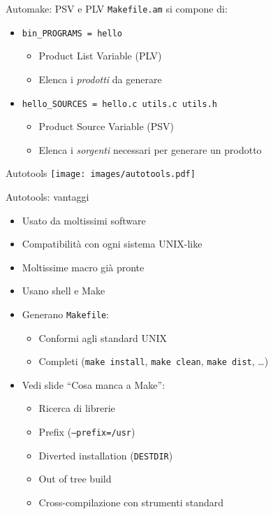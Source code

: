 \documentclass[xetex,table]{beamer}
\begin{document}
\begin{frame}[fragile]{Automake: PSV e PLV}
  \texttt{Makefile.am} si compone di:

  \begin{itemize}
  \item \texttt{bin_PROGRAMS = hello}
    \begin{itemize}
    \item Product List Variable (PLV)
    \item Elenca i {\em prodotti} da generare
    \end{itemize}
  \end{itemize}

  \begin{itemize}
  \item \texttt{hello_SOURCES = hello.c utils.c utils.h}
    \begin{itemize}
    \item Product Source Variable (PSV)
    \item Elenca i {\em sorgenti} necessari per generare un prodotto
    \end{itemize}
  \end{itemize}

\end{frame}

\begin{frame}{Autotools}
  \center\texttt{[image: images/autotools.pdf]}
\end{frame}

\begin{frame}{Autotools: vantaggi}
  \begin{itemize}

  \item Usato da moltissimi software
  \item Compatibilità con ogni sistema UNIX-like
  \item Moltissime macro già pronte
  \item Usano shell e Make
  \item Generano \texttt{Makefile}:
    \begin{itemize}
    \item Conformi agli standard UNIX
    \item Completi (\texttt{make install},
    \texttt{make clean},
    \texttt{make dist}, \dots)
    \end{itemize}

  \item Vedi slide ``Cosa manca a Make'':
    \begin{itemize}
    \item Ricerca di librerie
    \item Prefix (\texttt{--prefix=/usr})
    \item Diverted installation (\texttt{DESTDIR})
    \item Out of tree build
    \item Cross-compilazione con strumenti standard
    \end{itemize}

  \end{itemize}
\end{frame}
\end{document}
